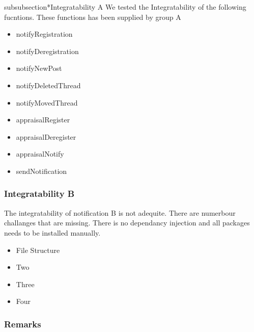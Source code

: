 subsubsection*{Integratability A}
We tested the Integratability of the following fucntions. These functions has been supplied by group A
\begin{itemize}
	\item notifyRegistration
	\item notifyDeregistration
	\item notifyNewPost
	\item notifyDeletedThread 
	\item notifyMovedThread
	\item appraisalRegister
	\item appraisalDeregister
	\item appraisalNotify
	\item sendNotification 
\end{itemize}
\subsubsection*{Integratability B}
The integratability of notification B is not adequite. There are numerbour challanges that are missing. There is no dependancy injection and all packages needs to be installed manually.
\begin{itemize}
	\item File Structure 
	\item Two 
	\item Three 
	\item Four 
\end{itemize}
\subsubsection*{Remarks}